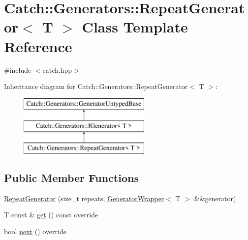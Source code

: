 \hypertarget{class_catch_1_1_generators_1_1_repeat_generator}{}\section{Catch\+::Generators\+::Repeat\+Generator$<$ T $>$ Class Template Reference}
\label{class_catch_1_1_generators_1_1_repeat_generator}


{\ttfamily \#include $<$catch.\+hpp$>$}

Inheritance diagram for Catch\+::Generators\+::Repeat\+Generator$<$ T $>$\+:\begin{figure}[H]
\begin{center}
\leavevmode
\includegraphics[height=3.000000cm]{class_catch_1_1_generators_1_1_repeat_generator}
\end{center}
\end{figure}
\subsection*{Public Member Functions}
\begin{DoxyCompactItemize}
\item 
\mbox{\hyperlink{class_catch_1_1_generators_1_1_repeat_generator_a3aee12c4f9c2c04823ca3c75a20f234f}{Repeat\+Generator}} (size\+\_\+t repeats, \mbox{\hyperlink{class_catch_1_1_generators_1_1_generator_wrapper}{Generator\+Wrapper}}$<$ T $>$ \&\&generator)
\item 
T const  \& \mbox{\hyperlink{class_catch_1_1_generators_1_1_repeat_generator_a43bd573274c9a0cd7f4406a3d0d36d49}{get}} () const override
\item 
bool \mbox{\hyperlink{class_catch_1_1_generators_1_1_repeat_generator_a24d5c2b1c09d6d220d4bd4c83f222dcb}{next}} () override
\end{DoxyCompactItemize}
